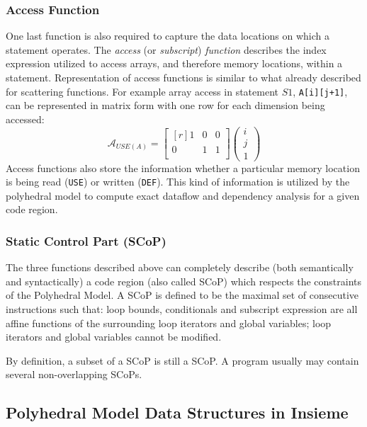 \subsubsection{Access Function}
One last function is also required to capture the data locations on which a
statement operates. The \emph{access} (or \emph{subscript}) \emph{function} 
describes the index expression utilized to access arrays, and therefore memory
locations, within a statement. Representation of access functions is similar to
what already described for scattering functions. For example array 
access in statement $S1$, \texttt{A[i][j+1]}, can be represented in matrix form
with one row for each dimension being accessed:
\[
\mathcal{A}_{USE(A)} =  \begin{bmatrix*}[r] 1 & 0 & 0 \\ 0 & 1 & 1 \\ 
						\end{bmatrix*} 
						\begin{pmatrix} i \\ j \\ 1 \end{pmatrix}
\]
Access functions also store the information whether a particular memory location
is being read (\texttt{USE}) or written (\texttt{DEF}). This kind of
information is utilized by the polyhedral model to compute exact dataflow and
dependency analysis for a given code region. 

\subsubsection{Static Control Part (SCoP)}

The three functions described above can completely describe (both semantically
and syntactically) a code region (also called SCoP) which respects the
constraints of the Polyhedral Model. A SCoP is defined to be the maximal set of
consecutive instructions such that: loop bounds, conditionals and subscript
expression are all affine functions of the surrounding loop iterators and global
variables; loop iterators and global variables cannot be modified. 

By definition, a subset of a SCoP is still a SCoP. A program usually may contain
several non-overlapping SCoPs. 

\subsection{Polyhedral Model Data Structures in Insieme}


